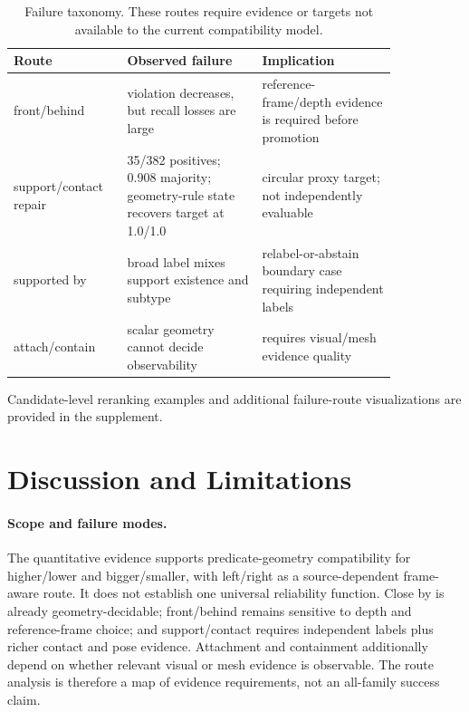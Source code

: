 \documentclass[letterpaper]{article} %
\begin{document}
\begin{table}[t]
\centering
\scriptsize
\setlength{\tabcolsep}{3pt}
\begin{tabular}{p{0.22\linewidth}p{0.31\linewidth}p{0.31\linewidth}}
\toprule
Route & Observed failure & Implication \\
\midrule
front/behind & violation decreases, but recall losses are large & reference-frame/depth evidence is required before promotion \\
support/contact repair & 35/382 positives; 0.908 majority; geometry-rule state recovers target at 1.0/1.0 & circular proxy target; not independently evaluable \\
supported by & broad label mixes support existence and subtype & relabel-or-abstain boundary case requiring independent labels \\
attach/contain & scalar geometry cannot decide observability & requires visual/mesh evidence quality \\
\bottomrule
\end{tabular}
\caption{Failure taxonomy. These routes require evidence or targets not
available to the current compatibility model.}
\label{tab:failure-taxonomy}
\end{table}

Candidate-level reranking examples and additional failure-route visualizations
are provided in the supplement.

\section{Discussion and Limitations}

\paragraph{Scope and failure modes.}
The quantitative evidence supports predicate-geometry compatibility for
higher/lower and bigger/smaller, with left/right as a source-dependent
frame-aware route. It does not establish one universal reliability function.
Close by is already geometry-decidable; front/behind remains sensitive to depth
and reference-frame choice; and support/contact requires independent labels plus
richer contact and pose evidence. Attachment and containment additionally depend
on whether relevant visual or mesh evidence is observable. The route analysis is
therefore a map of evidence requirements, not an all-family success claim.
\end{document}

